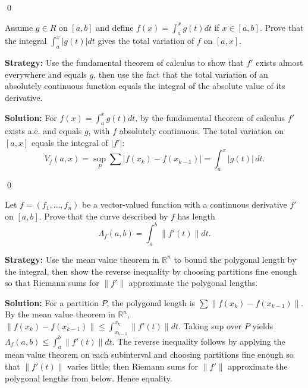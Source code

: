 \qed
\begin{problembox}
\begin{problemstatement}
Assume $g \in R$ on $[a, b]$ and define $f(x) = \int_a^x g(t) dt$ if $x \in [a, b]$. Prove that the integral $\int_a^x |g(t)| dt$ gives the total variation of $f$ on $[a, x]$.
\end{problemstatement}
\end{problembox}

\noindent\textbf{Strategy:} Use the fundamental theorem of calculus to show that $f'$ exists almost everywhere and equals $g$, then use the fact that the total variation of an absolutely continuous function equals the integral of the absolute value of its derivative.

\bigskip\noindent\textbf{Solution:}
For $f(x)=\int_a^x g(t)dt$, by the fundamental theorem of calculus $f'$ exists a.e. and equals $g$, with $f$ absolutely continuous. The total variation on $[a,x]$ equals the integral of $|f'|$:
\[V_f(a,x)=\sup_{P}\sum|f(x_k)-f(x_{k-1})|=\int_a^x |g(t)|\,dt.
\]




\qed
\begin{problembox}
\begin{problemstatement}
Let $f = (f_1, \ldots, f_n)$ be a vector-valued function with a continuous derivative $f'$ on $[a, b]$. Prove that the curve described by $f$ has length 
\[\Lambda_f(a, b) = \int_a^b \|f'(t)\| dt.\]
\end{problemstatement}
\end{problembox}

\noindent\textbf{Strategy:} Use the mean value theorem in $\mathbb{R}^n$ to bound the polygonal length by the integral, then show the reverse inequality by choosing partitions fine enough so that Riemann sums for $\|f'\|$ approximate the polygonal lengths.

\bigskip\noindent\textbf{Solution:}
For a partition $P$, the polygonal length is $\sum\|f(x_k)-f(x_{k-1})\|$. By the mean value theorem in $\mathbb{R}^n$, $\|f(x_k)-f(x_{k-1})\|\le \int_{x_{k-1}}^{x_k}\|f'(t)\|dt$. Taking sup over $P$ yields $\Lambda_f(a,b)\le\int_a^b\|f'(t)\|dt$. The reverse inequality follows by applying the mean value theorem on each subinterval and choosing partitions fine enough so that $\|f'(t)\|$ varies little; then Riemann sums for $\|f'\|$ approximate the polygonal lengths from below. Hence equality.




